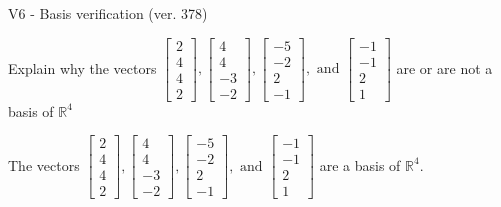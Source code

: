 \begin{exercise}
  \begin{exerciseTitle}V6 - Basis verification (ver. 378)\end{exerciseTitle}
  \begin{exerciseStatement}
    Explain why the vectors \(\left[\begin{array}{r}
2 \\
4 \\
4 \\
2
\end{array}\right] , \left[\begin{array}{r}
4 \\
4 \\
-3 \\
-2
\end{array}\right] , \left[\begin{array}{r}
-5 \\
-2 \\
2 \\
-1
\end{array}\right] , \text{ and } \left[\begin{array}{r}
-1 \\
-1 \\
2 \\
1
\end{array}\right]\) are or are not a basis of \(\mathbb{R}^4\)	


  \end{exerciseStatement}
  \begin{exerciseAnswer}
   The vectors \(\left[\begin{array}{r}
2 \\
4 \\
4 \\
2
\end{array}\right] , \left[\begin{array}{r}
4 \\
4 \\
-3 \\
-2
\end{array}\right] , \left[\begin{array}{r}
-5 \\
-2 \\
2 \\
-1
\end{array}\right] , \text{ and } \left[\begin{array}{r}
-1 \\
-1 \\
2 \\
1
\end{array}\right]\) 
  	 are  a basis of \(\mathbb{R}^4\).
  


  \end{exerciseAnswer}
\end{exercise}